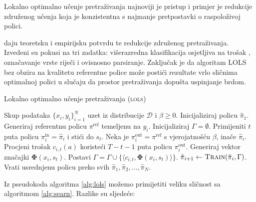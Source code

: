 Lokalno optimalno učenje pretraživanja 
najnoviji je pristup i primjer je redukcije združenog učenja koja je
konzistentna s najmanje pretpostavki o raspoloživoj polici.

\cite{daume15lols} daju teoretsku i empirijsku potvrdu te redukcije združenog
pretraživanja. Izvedeni su pokusi na tri zadatka: višerazredna klasifikacija
osjetljiva na trošak ,
označavanje vrste riječi i ovisnosno parsiranje. Zaključak je da algoritam
\textsc{LOLS} bez obzira na kvalitetu referentne police može postići rezultate
vrlo sličnima optimalnoj polici u slučaju da prostor pretraživanja dopušta
uspinjanje brdom.

\begin{algorithm}
\caption{Lokalno optimalno učenje pretraživanja (\textsc{lols})}\label{alg:lols}
\begin{algorithmic}[1]
\Require Skup podataka $\{x_i, y_i\}_{i=1}^N$ uzet iz distribucije $\mathcal{D}$
         i $\beta \geq 0$. %
\State Inicijaliziraj policu $\hat{\pi}_1$.
  \State Generiraj referentnu policu $\pi^{\text{ref}}$ temeljenu na $y_i$.
  \State Inicijaliziraj $\Gamma = \emptyset$. 
    \State Primijeniti $t$ puta policu $\pi_{i}^{\text{in}} = \hat{\pi}_i$  i stići do $s_t$.  \label{alg:lols:learned}
      \State Neka je  $\pi_{i}^{\text{out}} = \pi^{\text{ref}}$ s vjerojatnošću $\beta$, inače $\hat{\pi}_i$.
      \State Procjeni trošak $c_{i,t}(a)$ koristeći $T-t-1$ puta policu $\pi_{i}^{\text{out}}$.  \label{alg:lols:mixture}
    \EndFor
    \State Generiraj vektor značajki $\mathbf{\Phi}(x_i, s_t)$.
    \State Postavi $\Gamma = \Gamma \cup \{\langle c_{i,t}, \mathbf{\Phi}(x_i, s_t) \rangle\}$.
  \EndFor
  \State $\hat{\pi}_{i+1} \gets \textsc{Train}(\hat{\pi}_i, \Gamma)$.
\EndFor
\State Vrati usrednjenu policu preko svih $\hat{\pi}_1, \hat{\pi}_2, \ldots, \hat{\pi}_N$.
\end{algorithmic}
\end{algorithm}

Iz pseudokoda algoritma \ref{alg:lols} možemo primijetiti veliku sličnost sa
algoritmom \ref{alg:searn}. Razlike su sljedeće:

